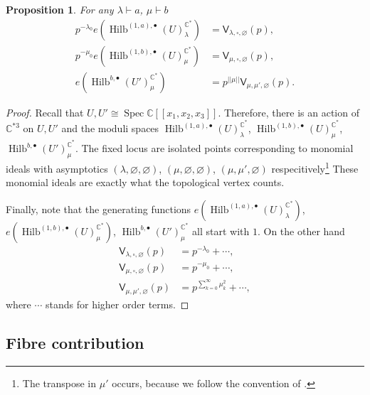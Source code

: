 \documentclass{amsart}
\newtheorem{proposition}[theorem]{Proposition}
\theoremstyle{definition}
\newcommand{\CC} {\mathbb{C}}          %
\newcommand{\sfV}{\mathsf{V}}
\newcommand{\Hilb}{\operatorname{Hilb}}
\newcommand{\Spec}{\operatorname{Spec}}
\begin{document}
\begin{proposition} \label{vertex1}
For any $\lambda \vdash a$, $\mu \vdash b$
\begin{align*}
p^{-\lambda_0} e(\Hilb^{(1,a),\bullet}(U)_{\lambda}^{\CC^*}) &= \sfV_{\lambda,\square,\varnothing}(p), \\
p^{-\mu_0} e(\Hilb^{(1,b),\bullet}(U)_{\mu}^{\CC^*}) &= \sfV_{\mu,\square,\varnothing}(p), \\
e(\Hilb^{b,\bullet}(U')_{\mu}^{\CC^*}) &= p^{|\!|\mu|\!|} \sfV_{\mu,\mu',\varnothing}(p).
\end{align*}
\end{proposition}
\begin{proof}
Recall that $U,U' \cong \Spec \CC[\![x_1,x_2,x_3]\!]$. Therefore, there is an action of $\CC^{*3}$ on $U, U'$ and the moduli spaces $\Hilb^{(1,a),\bullet}(U)_{\lambda}^{\CC^*}$, $\Hilb^{(1,b),\bullet}(U)_{\mu}^{\CC^*}$, $\Hilb^{b,\bullet}(U')_{\mu}^{\CC^*}$. The fixed locus are isolated points corresponding to monomial ideals with asymptotics $(\lambda,\varnothing,\varnothing)$, $(\mu,\varnothing,\varnothing)$, $(\mu,\mu',\varnothing)$ respecitively\footnote{The transpose in $\mu'$ occurs, because we follow the convention of \cite{ORV}.} These monomial ideals are exactly what the topological vertex counts. 

Finally, note that the generating functions $e(\Hilb^{(1,a),\bullet}(U)_{\lambda}^{\CC^*})$, $e(\Hilb^{(1,b),\bullet}(U)_{\mu}^{\CC^*})$, $\Hilb^{b,\bullet}(U')_{\mu}^{\CC^*}$ all start with $1$. On the other hand
\begin{align*}
\sfV_{\lambda,\square,\varnothing}(p) &= p^{-\lambda_0} + \cdots, \\
\sfV_{\mu,\square,\varnothing}(p) &= p^{-\mu_0} + \cdots, \\
\sfV_{\mu,\mu',\varnothing}(p) &= p^{\sum_{k=0}^{\infty} \mu_{k}^{2}} + \cdots,
\end{align*}
where $\cdots$ stands for higher order terms.
\end{proof}

   
\subsection{Fibre contribution}
\end{document}

